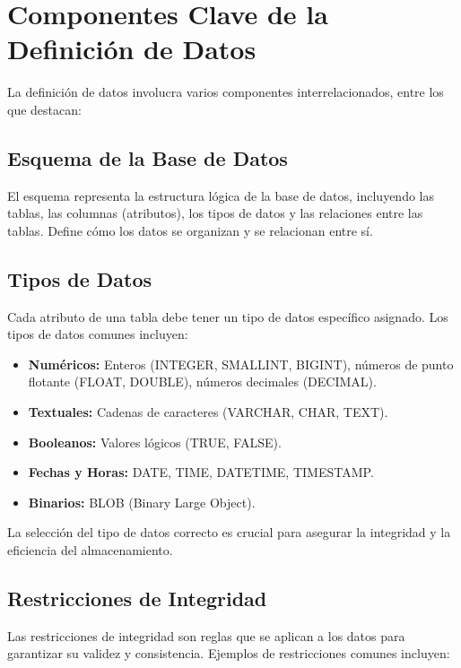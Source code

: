 \section{Componentes Clave de la Definición de Datos}

La definición de datos involucra varios componentes interrelacionados, entre los que destacan:

\subsection{Esquema de la Base de Datos}

El esquema representa la estructura lógica de la base de datos, incluyendo las tablas, las columnas (atributos), los tipos de datos y las relaciones entre las tablas.  Define cómo los datos se organizan y se relacionan entre sí.

\subsection{Tipos de Datos}

Cada atributo de una tabla debe tener un tipo de datos específico asignado.  Los tipos de datos comunes incluyen:

\begin{itemize}
    \item \textbf{Numéricos:} Enteros (INTEGER, SMALLINT, BIGINT), números de punto flotante (FLOAT, DOUBLE), números decimales (DECIMAL).
    \item \textbf{Textuales:} Cadenas de caracteres (VARCHAR, CHAR, TEXT).
    \item \textbf{Booleanos:} Valores lógicos (TRUE, FALSE).
    \item \textbf{Fechas y Horas:} DATE, TIME, DATETIME, TIMESTAMP.
    \item \textbf{Binarios:} BLOB (Binary Large Object).
\end{itemize}

La selección del tipo de datos correcto es crucial para asegurar la integridad y la eficiencia del almacenamiento.

\subsection{Restricciones de Integridad}

Las restricciones de integridad son reglas que se aplican a los datos para garantizar su validez y consistencia.  Ejemplos de restricciones comunes incluyen:

